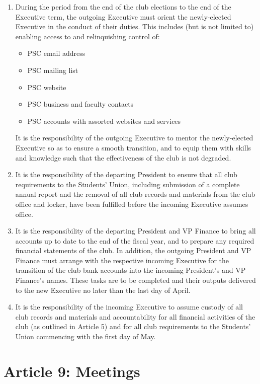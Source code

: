 \documentclass{article}
\begin{document}
\begin{enumerate}
    \item During the period from the end of the club elections to the end of the Executive term, the outgoing Executive must orient the newly-elected Executive in the conduct of their duties.
        This includes (but is not limited to) enabling access to and relinquishing control of:
        \begin{itemize}
            \item PSC email address
            \item PSC mailing list
            \item PSC website
            \item PSC business and faculty contacts
            \item PSC accounts with assorted websites and services
        \end{itemize}
        It is the responsibility of the outgoing Executive to mentor the newly-elected Executive so as to ensure a smooth transition, and to equip them with skills and knowledge such that the effectiveness of the club is not degraded.
    \item It is the responsibility of the departing President to ensure that all club requirements to the Students' Union, including submission of a complete annual report and the removal of all club records and materials from the club office and locker, have been fulfilled before the incoming Executive assumes office.
    \item It is the responsibility of the departing President and VP Finance to bring all accounts up to date to the end of the fiscal year, and to prepare any required financial statements of the club. 
In addition, the outgoing President and VP Finance must arrange with the respective incoming Executive for the transition of the club bank accounts into the incoming President's and VP Finance's names. These tasks are to be completed and their outputs delivered to the new Executive no later than the last day of April.
    \item It is the responsibility of the incoming Executive to assume custody of all club records and materials and accountability for all financial activities of the club (as outlined in Article 5) and for all club requirements to the Students' Union commencing with the first day of May.
\end{enumerate}

\section{Article 9: Meetings}
\end{document}
